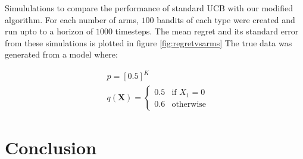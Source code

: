 \documentclass{article}
\newcommand{\eq}[1]{\begin{align*}#1\end{align*}}
\theoremstyle{plain}
\theoremstyle{definition}
\begin{document}
Simululations to compare the performance of standard UCB with our modified algorithm. For each number of arms, $100$ bandits of each type were created and run upto to a horizon of $1000$ timesteps. The mean regret and its standard error from these simulations is plotted in figure \ref{fig:regretvsarms} The true data was generated from a model where:

\eq{
&p = [0.5]^{K}\\
&q(\boldsymbol{X}) = \begin{cases}0.5 & \text{if $X_{1}=0$}\\ 0.6 & \text{otherwise} \end{cases}
}






\section{Conclusion}



\end{document}
